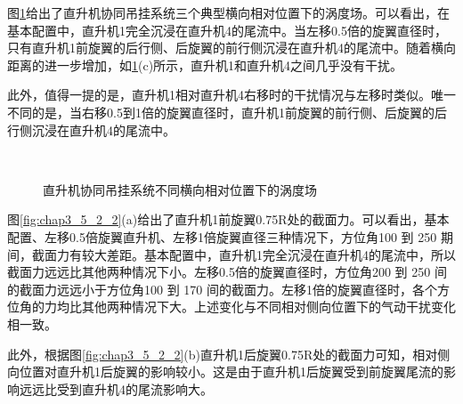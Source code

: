图\ref{fig:chap3_5_2_1}给出了直升机协同吊挂系统三个典型横向相对位置下的涡度场。可以看出，在基本配置中，直升机1完全沉浸在直升机4的尾流中。当左移0.5倍的旋翼直径时，只有直升机1前旋翼的后行侧、后旋翼的前行侧沉浸在直升机4的尾流中。随着横向距离的进一步增加，如\ref{fig:chap3_5_2_1}(c)所示，直升机1和直升机4之间几乎没有干扰。

此外，值得一提的是，直升机1相对直升机4右移时的干扰情况与左移时类似。唯一不同的是，当右移0.5到1倍的旋翼直径时，直升机1前旋翼的前行侧、后旋翼的后行侧沉浸在直升机4的尾流中。
\begin{figure}[!htb]
  \centering
  \\ 
  \quad
  \caption{直升机协同吊挂系统不同横向相对位置下的涡度场}
  \label{fig:chap3_5_2_1}
\end{figure}

图\ref{fig:chap3_5_2_2}(a)给出了直升机1前旋翼0.75R处的截面力。可以看出，基本配置、左移0.5倍旋翼直升机、左移1倍旋翼直径三种情况下，方位角100 \degree 到 250 \degree 期间，截面力有较大差距。基本配置中，直升机1完全沉浸在直升机4的尾流中，所以截面力远远比其他两种情况下小。左移0.5倍的旋翼直径时，方位角200 \degree 到 250 \degree 间的截面力远远小于方位角100 \degree 到 170 \degree 间的截面力。左移1倍的旋翼直径时，各个方位角的力均比其他两种情况下大。上述变化与不同相对侧向位置下的气动干扰变化相一致。

此外，根据图\ref{fig:chap3_5_2_2}(b)直升机1后旋翼0.75R处的截面力可知，相对侧向位置对直升机1后旋翼的影响较小。这是由于直升机1后旋翼受到前旋翼尾流的影响远远比受到直升机4的尾流影响大。

